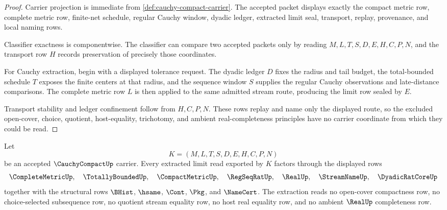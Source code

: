 \begin{proof}
Carrier projection is immediate from \autoref{def:cauchy-compact-carrier}. The accepted packet displays exactly the compact metric row, complete metric row, finite-net schedule, regular Cauchy window, dyadic ledger, extracted limit seal, transport, replay, provenance, and local naming rows.

Classifier exactness is componentwise. The classifier can compare two accepted packets only by reading $M,L,T,S,D,E,H,C,P,N$, and the transport row $H$ records preservation of precisely those coordinates.

For Cauchy extraction, begin with a displayed tolerance request. The dyadic ledger $D$ fixes the radius and tail budget, the total-bounded schedule $T$ exposes the finite centers at that radius, and the sequence window $S$ supplies the regular Cauchy observations and late-distance comparisons. The complete metric row $L$ is then applied to the same admitted stream route, producing the limit row sealed by $E$.

Transport stability and ledger confinement follow from $H,C,P,N$. These rows replay and name only the displayed route, so the excluded open-cover, choice, quotient, host-equality, trichotomy, and ambient real-completeness principles have no carrier coordinate from which they could be read.
\end{proof}

\begin{theorem}
\label{thm:cauchy-compact-extraction-scope}
Let
$$
K=(M,L,T,S,D,E,H,C,P,N)
$$
be an accepted $\CauchyCompactUp$ carrier. Every extracted limit read exported by $K$ factors through the displayed rows
$$
\CompleteMetricUp,\quad
\TotallyBoundedUp,\quad
\CompactMetricUp,\quad
\RegSeqRatUp,\quad
\RealUp,\quad
\StreamNameUp,\quad
\DyadicRatCoreUp
$$
together with the structural rows $\BHist$, $\hsame$, $\Cont$, $\Pkg$, and $\NameCert$. The extraction reads no open-cover compactness row, no choice-selected subsequence row, no quotient stream equality row, no host real equality row, and no ambient $\RealUp$ completeness row.
\end{theorem}


